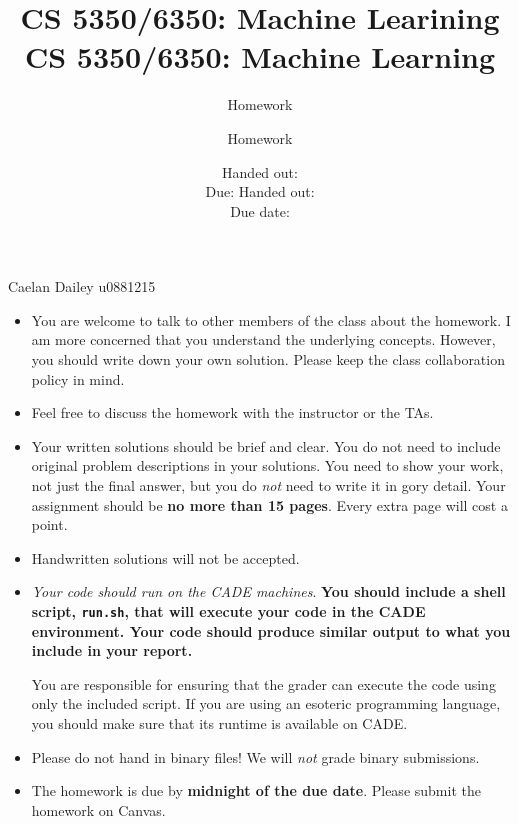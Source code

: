 \documentclass[12pt, fullpage,letterpaper]{article}
\title{CS 5350/6350: Machine Learining \semester}
\author{Homework \assignmentId}
\date{Handed out: \releaseDate\\
	Due: \dueDate}
\title{CS 5350/6350: Machine Learning \semester}
\author{Homework \assignmentId}
\date{Handed out: \releaseDate\\
  Due date: \dueDate}
\begin{document}
\maketitle

Caelan Dailey u0881215


\newcommand{\Hcal}{\mathcal{H}} 
{\footnotesize
	\begin{itemize}
		\item You are welcome to talk to other members of the class about
		the homework. I am more concerned that you understand the
		underlying concepts. However, you should write down your own
		solution. Please keep the class collaboration policy in mind.
		
		\item Feel free to discuss the homework with the instructor or the TAs.
		
		\item Your written solutions should be brief and clear. You do not need to include original problem descriptions in your solutions. You need to
		show your work, not just the final answer, but you do \emph{not}
		need to write it in gory detail. Your assignment should be {\bf no
			more than 15 pages}. Every extra page will cost a point.
		
		\item Handwritten solutions will not be accepted.
		
		
		\item {\em Your code should run on the CADE machines}. \textbf{You should
		include a shell script, {\tt run.sh}, that will execute your code
		in the CADE environment. Your code should produce similar output to what you include in your report.}
		
		You are responsible for ensuring that the grader can execute the
		code using only the included script. If you are using an
		esoteric programming language, you should make sure that its
		runtime is available on CADE.
		
		\item Please do not hand in binary files! We will {\em not} grade
		binary submissions.
		
		\item The homework is due by \textbf{midnight of the due date}. Please submit
		the homework on Canvas.
		
	\end{itemize}
}
\end{document}
